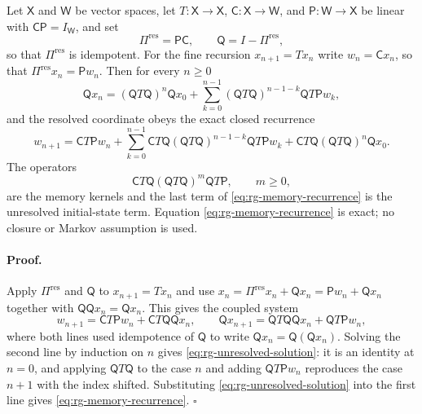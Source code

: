 Let $\mathsf X$ and $\mathsf W$ be vector spaces, let $T:\mathsf X\to\mathsf X$,
$\mathsf C:\mathsf X\to\mathsf W$, and $\mathsf P:\mathsf W\to\mathsf X$ be
linear with $\mathsf C\mathsf P=I_{\mathsf W}$, and set
\begin{equation}
\Pi^{\mathrm{res}}=\mathsf P\mathsf C,
\qquad
\mathsf Q=I-\Pi^{\mathrm{res}},
\label{eq:rg-resolved-projection}
\end{equation}
so that $\Pi^{\mathrm{res}}$ is idempotent.  For the fine recursion
$x_{n+1}=Tx_n$ write $w_n=\mathsf Cx_n$, so that
$\Pi^{\mathrm{res}}x_n=\mathsf Pw_n$.  Then for every $n\geq0$
\begin{equation}
\mathsf Qx_n
=(\mathsf QT\mathsf Q)^n\mathsf Qx_0
+\sum_{k=0}^{n-1}
(\mathsf QT\mathsf Q)^{n-1-k}\mathsf QT\mathsf Pw_k,
\label{eq:rg-unresolved-solution}
\end{equation}
and the resolved coordinate obeys the exact closed recurrence
\begin{equation}
w_{n+1}
=\mathsf CT\mathsf Pw_n
+\sum_{k=0}^{n-1}
\mathsf CT\mathsf Q(\mathsf QT\mathsf Q)^{n-1-k}\mathsf QT\mathsf Pw_k
+\mathsf CT\mathsf Q(\mathsf QT\mathsf Q)^{n}\mathsf Qx_0 .
\label{eq:rg-memory-recurrence}
\end{equation}
The operators
\begin{equation}
\mathsf CT\mathsf Q(\mathsf QT\mathsf Q)^{m}\mathsf QT\mathsf P,
\qquad m\geq0,
\label{eq:rg-memory-operators}
\end{equation}
are the memory kernels and the last term of
\eqref{eq:rg-memory-recurrence} is the unresolved initial-state term.  Equation
\eqref{eq:rg-memory-recurrence} is exact; no closure or Markov assumption is
used. 

\paragraph{Proof.}
Apply $\Pi^{\mathrm{res}}$ and $\mathsf Q$ to $x_{n+1}=Tx_n$ and use
$x_n=\Pi^{\mathrm{res}}x_n+\mathsf Qx_n=\mathsf Pw_n+\mathsf Qx_n$ together with
$\mathsf Q\mathsf Qx_n=\mathsf Qx_n$.  This gives the coupled system
\[
w_{n+1}=\mathsf CT\mathsf Pw_n+\mathsf CT\mathsf Q \mathsf Qx_n,
\qquad
\mathsf Qx_{n+1}=\mathsf QT\mathsf Q \mathsf Qx_n+\mathsf QT\mathsf Pw_n,
\]
where both lines used idempotence of $\mathsf Q$ to write
$\mathsf Q x_n=\mathsf Q(\mathsf Qx_n)$.  Solving the
second line by induction on $n$ gives
\eqref{eq:rg-unresolved-solution}: it is an identity at $n=0$, and applying
$\mathsf QT\mathsf Q$ to the case $n$ and adding
$\mathsf QT\mathsf Pw_n$ reproduces the case $n+1$ with the index shifted.
Substituting \eqref{eq:rg-unresolved-solution} into the first line gives
\eqref{eq:rg-memory-recurrence}. $\square$

